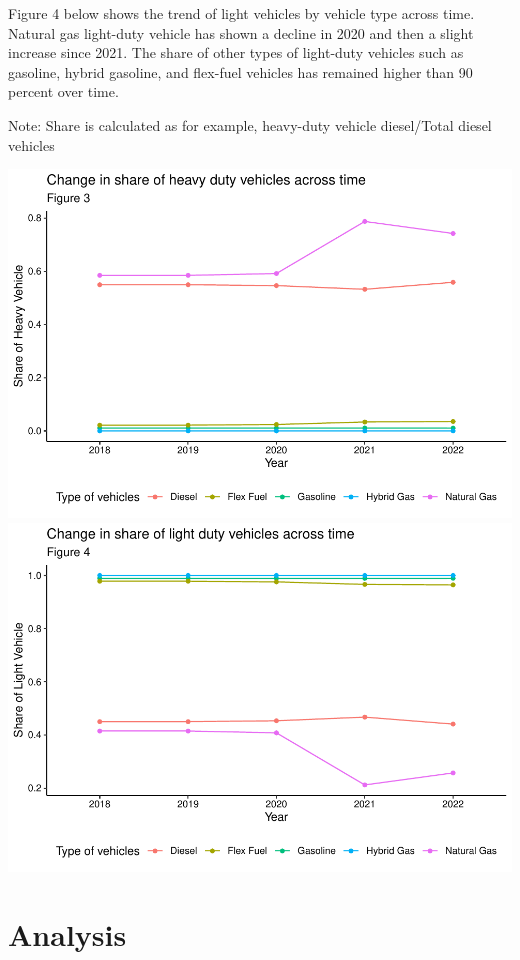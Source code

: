 \documentclass[
  12pt,
]{article}
\begin{document}
Figure 4 below shows the trend of light vehicles by vehicle type across
time. Natural gas light-duty vehicle has shown a decline in 2020 and
then a slight increase since 2021. The share of other types of
light-duty vehicles such as gasoline, hybrid gasoline, and flex-fuel
vehicles has remained higher than 90 percent over time.

Note: Share is calculated as for example, heavy-duty vehicle
diesel/Total diesel vehicles

\includegraphics{Code_Main-Markdown_files/figure-latex/unnamed-chunk-4-1.pdf}
\includegraphics{Code_Main-Markdown_files/figure-latex/unnamed-chunk-4-2.pdf}

\newpage

\hypertarget{analysis}{%
\section{Analysis}\label{analysis}}
\end{document}
